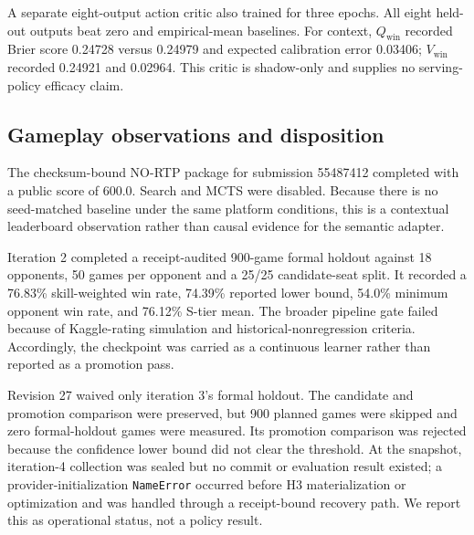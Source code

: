 A separate eight-output action critic also trained for three epochs. All eight
held-out outputs beat zero and empirical-mean baselines. For context,
$Q_{\mathrm{win}}$ recorded Brier score 0.24728 versus 0.24979 and expected
calibration error 0.03406; $V_{\mathrm{win}}$ recorded 0.24921 and 0.02964.
This critic is shadow-only and supplies no serving-policy efficacy claim.

\subsection{Gameplay observations and disposition}

The checksum-bound NO-RTP package for submission 55487412 completed with a
public score of 600.0. Search and MCTS were disabled. Because there is no
seed-matched baseline under the same platform conditions, this is a contextual
leaderboard observation rather than causal evidence for the semantic adapter.

Iteration 2 completed a receipt-audited 900-game formal holdout against 18
opponents, 50 games per opponent and a 25/25 candidate-seat split. It recorded
a 76.83\% skill-weighted win rate, 74.39\% reported lower bound, 54.0\% minimum
opponent win rate, and 76.12\% S-tier mean. The broader pipeline gate failed
because of Kaggle-rating simulation and historical-nonregression criteria.
Accordingly, the checkpoint was carried as a continuous learner rather than
reported as a promotion pass.

Revision 27 waived only iteration 3's formal holdout. The candidate and
promotion comparison were preserved, but 900 planned games were skipped and
zero formal-holdout games were measured. Its promotion comparison was rejected
because the confidence lower bound did not clear the threshold. At the
snapshot, iteration-4 collection was sealed but no commit or evaluation result
existed; a provider-initialization \texttt{NameError} occurred before H3
materialization or optimization and was handled through a receipt-bound
recovery path. We report this as operational status, not a policy result.
